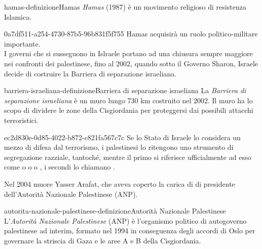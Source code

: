 \documentclass[preview]{standalone}
\begin{document}
\begin{snippetdefinition}{hamas-definizione}{Hamas}
    \textit{Hamas} (1987) è un movimento religioso di resistenza Islamica.
\end{snippetdefinition}

\begin{snippet}{0a7df511-a254-4730-87b5-96b831f5f755}
    Hamas acquisirà un ruolo politico-militare importante.
    \\
    I governi che si susseguono in Islraele portano ad una chiusura sempre maggiore
    nei confronti dei palestinese, fino al 2002, quando sotto il Governo
    Sharon, Israele decide di costruire la Barriera di separazione israeliana.
\end{snippet}

\begin{snippetdefinition}{barriera-israeliana-definizione}{Barriera di separazione israeliana}
    La \textit{Barriera di separazione israeliana} è un muro lungo 730 km costruito nel 2002.
    Il muro ha lo scopo di dividere le zone della Cisgiordania per proteggersi
    dai possibili attacchi terroristici.
\end{snippetdefinition}

\begin{snippet}{ec2d830e-0d85-4022-b872-c821fa567c7c}
    Se lo Stato di Israele lo considera un mezzo di difesa dal terrorismo,
    i palestinesi lo ritengono uno strumento di segregazione razziale,
    tantoché, mentre il primo si riferisce ufficialmente ad esso come
     o  o
     o ,
    i secondi lo chiamano .
    
    Nel 2004 muore Yasser Arafat, che aveva coperto la carica di
    di presidente dell'Autorità Nazionale Palestinese (ANP).
\end{snippet}

\begin{snippetdefinition}{autorita-nazionale-palestinese-definizione}{Autorità Nazionale Palestinese}
    L'\textit{Autorità Nazionale Palestinese} (ANP) è
    l'organismo politico di autogoverno palestinese ad interim,
    formato nel 1994 in conseguenza degli accordi di Oslo
    per governare la striscia di Gaza e le aree A e B della Cisgiordania. 
\end{snippetdefinition}

\end{document}

